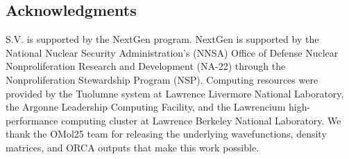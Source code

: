 \documentclass{article}
\begin{document}



\begin{hide}
\section*{Acknowledgments}
S.V. is supported by the NextGen program. NextGen is supported by the National Nuclear Security Administration's (NNSA)
Office of Defense Nuclear Nonproliferation Research and Development (NA-22)
through the Nonproliferation Stewardship Program (NSP).
Computing resources were provided by the Tuolumne system at Lawrence Livermore
National Laboratory, the Argonne
Leadership Computing Facility, and the Lawrencium high-performance
computing cluster at Lawrence Berkeley National Laboratory.
We thank the OMol25 team for releasing the underlying wavefunctions, density
matrices, and ORCA outputs that make this work possible.
\end{hide}
\newpage



\newpage
\appendix

\end{document}
